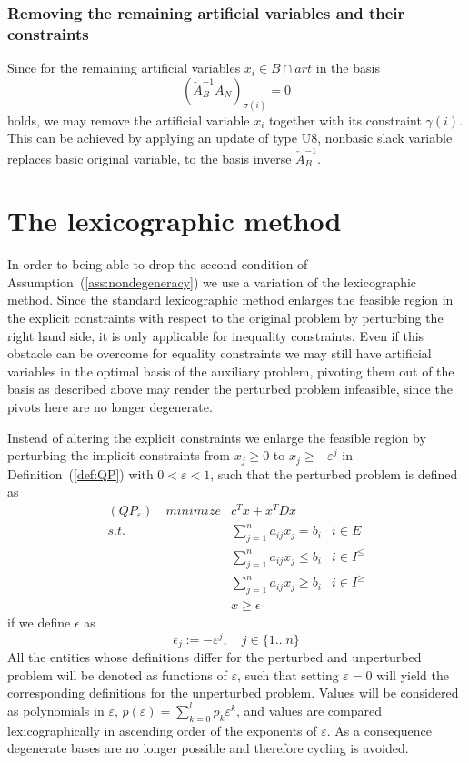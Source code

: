 \documentclass[a4paper]{article}
\begin{document}
\subsubsection{Removing the remaining artificial variables and their
constraints}
Since for the remaining artificial variables $x_{i} \in B \cap art$ in
the basis
\begin{equation}
(\check{A}_{B}^{-1}A_{N})_{\sigma(i)} = 0 
\end{equation}
holds,
we may remove the artificial variable $x_{i}$ together with its constraint
$\gamma(i)$. This can be achieved by applying an update of type U8, nonbasic
slack variable replaces basic original variable, to the basis inverse
$\check{A}_{B}^{-1}$. 
 
\section{The lexicographic method}
In order to being able to drop the second condition of
Assumption~(\ref{ass:nondegeneracy}) we use a variation of the lexicographic
method. Since the standard lexicographic method enlarges the feasible region
in the explicit constraints with respect to the original problem by perturbing
the right hand side, it is only applicable for inequality
constraints. Even if this obstacle can be overcome for equality constraints we
may still have artificial variables in the optimal basis of the auxiliary
problem, pivoting them out of the basis as described above may render the
perturbed problem infeasible, since the pivots here are no longer degenerate.

Instead of altering the explicit constraints we enlarge the feasible region by
perturbing the implicit constraints from $x_{j} \geq 0$ to $x_{j} \geq
-\varepsilon^{j}$ in Definition~(\ref{def:QP}) with $0 < \varepsilon < 1$, such
that the perturbed problem is defined as
\begin{eqnarray}
\label{def:QP_eps}
(QP_{\varepsilon})\quad minimize&  c^{T}x + x^{T} D x   & \nonumber \\
s.t.	 & \sum_{j=1}^{n}a_{ij}x_{j} = b_{i}	& i \in E \nonumber \\
	 & \sum_{j=1}^{n}a_{ij}x_{j} \leq b_{i} & i \in I^{\leq} \\
	 & \sum_{j=1}^{n}a_{ij}x_{j} \geq b_{i} & i \in I^{\geq} \nonumber \\
	 & x \geq \epsilon				& \nonumber  
\end{eqnarray}
if we define $\epsilon$ as
\begin{equation}
\epsilon_{j}:= -\varepsilon^{j}, \quad j \in \{1 \dots n \}
\end{equation}
All the entities whose definitions differ for the perturbed and
unperturbed problem  will be denoted as functions of $\varepsilon$,
such that setting $\varepsilon =0$ will yield the corresponding definitions
for the unperturbed problem.
Values will be considered as polynomials in $\varepsilon$,
$p(\varepsilon)=\sum_{k=0}^{l}p_{k}\varepsilon^{k}$, and values are compared
lexicographically in ascending order of the exponents of $\varepsilon$. As
a consequence degenerate bases are no longer possible and therefore cycling is
avoided.   
\end{document}
